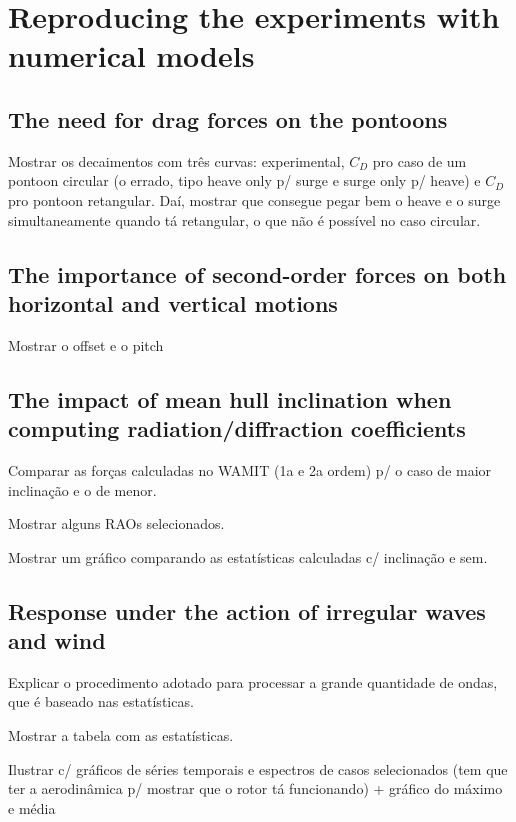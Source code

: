 \section{Reproducing the experiments with numerical models} \label{sec:exp_vs_num}

\subsection{The need for drag forces on the pontoons}
Mostrar os decaimentos com três curvas: experimental, $C_D$ pro caso de um pontoon circular (o errado, tipo heave only p/ surge e surge only p/ heave) e $C_D$ pro pontoon retangular. Daí, mostrar que consegue pegar bem o heave e o surge simultaneamente quando tá retangular, o que não é possível no caso circular.

\subsection{The importance of second-order forces on both horizontal and vertical motions}
Mostrar o offset e o pitch

\subsection{The impact of mean hull inclination when computing radiation/diffraction coefficients}
Comparar as forças calculadas no WAMIT (1a e 2a ordem) p/ o caso de maior inclinação e o de menor.

Mostrar alguns RAOs selecionados.

Mostrar um gráfico comparando as estatísticas calculadas c/ inclinação e sem.



\subsection{Response under the action of irregular waves and wind}
Explicar o procedimento adotado para processar a grande quantidade de ondas, que é baseado nas estatísticas.

Mostrar a tabela com as estatísticas.

Ilustrar c/ gráficos de séries temporais e espectros de casos selecionados (tem que ter a aerodinâmica p/ mostrar que o rotor tá funcionando) + gráfico do máximo e média
